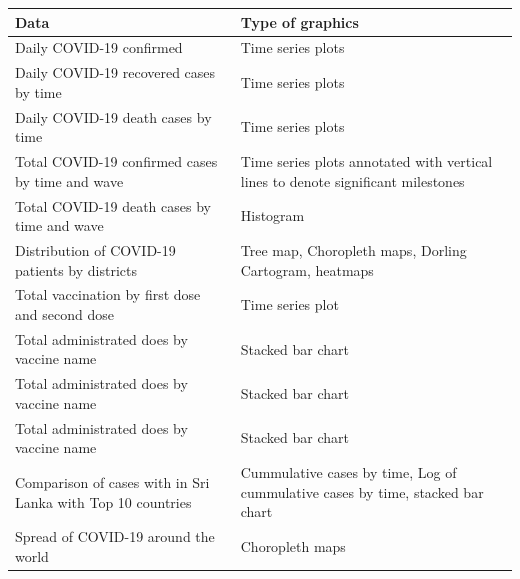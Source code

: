 \documentclass[
]{article}
\begin{document}
\begin{longtable}[]{@{}
  >{\raggedright\arraybackslash}p{}
  >{\raggedright\arraybackslash}p{}@{}}
\toprule
\textbf{Data} & \textbf{Type of graphics} \\
\midrule
\endhead
Daily COVID-19 confirmed & Time series plots \hfill\break \\
Daily COVID-19 recovered cases by time & Time series plots
\hfill\break \\
Daily COVID-19 death cases by time & Time series plots \hfill\break \\
Total COVID-19 confirmed cases by time and wave & Time series plots
annotated with vertical lines to denote significant milestones
\hfill\break \\
Total COVID-19 death cases by time and wave & Histogram \hfill\break \\
Distribution of COVID-19 patients by districts & Tree map, Choropleth
maps, Dorling Cartogram, heatmaps \hfill\break \\
Total vaccination by first dose and second dose & Time series plot
\hfill\break \\
Total administrated does by vaccine name & Stacked bar chart
\hfill\break \\
Total administrated does by vaccine name & Stacked bar chart
\hfill\break \\
Total administrated does by vaccine name & Stacked bar chart
\hfill\break \\
Comparison of cases with in Sri Lanka with Top 10 countries &
Cummulative cases by time, Log of cummulative cases by time, stacked bar
chart \hfill\break \\
Spread of COVID-19 around the world & Choropleth maps \hfill\break \\
\bottomrule
\end{longtable}
\end{document}
